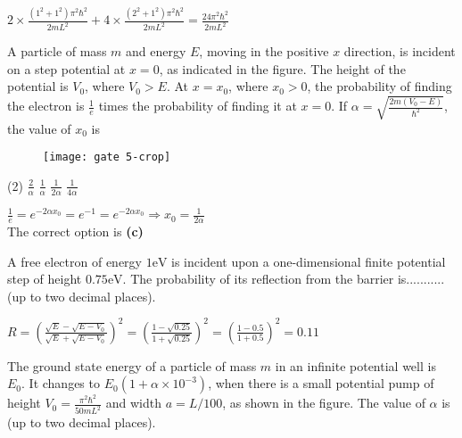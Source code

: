 \begin{enumerate}
\begin{minipage}{\textwidth}
	\end{minipage}
	\begin{answer}
		$ 2 \times \frac{\left(1^{2}+1^{2}\right) \pi^{2} \hbar^{2}}{2 m L^{2}}+4 \times \frac{\left(2^{2}+1^{2}\right) \pi^{2} \hbar^{2}}{2 m L^{2}}=\frac{24 \pi^{2} \hbar^{2}}{2 m L^{2}}$	
	\end{answer}
	\begin{minipage}{\textwidth}
		\item A particle of mass $m$ and energy $E$, moving in the positive $x$ direction, is incident on a step potential at $x=0$, as indicated in the figure. The height of the potential is $V_{0}$, where $V_{0}>E$. At $x=x_{0}$, where $x_{0}>0$, the probability of finding the electron is $\frac{1}{e}$ times the probability of finding it at $x=0$. If $\alpha=\sqrt{\frac{2 m\left(V_{0}-E\right)}{\hbar^{2}}}$, the value of $x_{0}$ is
		\begin{figure}[H]
			\centering
			\texttt{[image: gate 5-crop]}
		\end{figure}
	\end{minipage}
	\begin{tasks}(2)
		\task[\textbf{A.}] $\frac{2}{\alpha}$
		\task[\textbf{B.}] $\frac{1}{\alpha}$
		\task[\textbf{C.}]$\frac{1}{2 \alpha}$
		\task[\textbf{D.}]$\frac{1}{4 \alpha}$
	\end{tasks}
	\begin{answer}
		$\frac{1}{e}=e^{-2 \alpha x_{0}}=e^{-1}=e^{-2 \alpha x_{0}} \Rightarrow x_{0}=\frac{1}{2 \alpha}$\\
		The correct option is \textbf{(c)}	
	\end{answer}
	\begin{minipage}{\textwidth}
		\item A free electron of energy $1 \mathrm{eV}$ is incident upon a one-dimensional finite potential step of height $0.75 \mathrm{eV}$. The probability of its reflection from the barrier is........... (up to two decimal places).
	\end{minipage}
	\begin{answer}
		$R=\left(\frac{\sqrt{E}-\sqrt{E-V_{0}}}{\sqrt{E}+\sqrt{E-V_{0}}}\right)^{2}=\left(\frac{1-\sqrt{0.25}}{1+\sqrt{0.25}}\right)^{2}=\left(\frac{1-0.5}{1+0.5}\right)^{2}=0.11$
	\end{answer}
	\begin{minipage}{\textwidth}
		\item The ground state energy of a particle of mass $m$ in an infinite potential well is $E_{0} .$ It changes to $E_{0}\left(1+\alpha \times 10^{-3}\right)$, when there is a small potential pump of height $V_{0}=\frac{\pi^{2} \hbar^{2}}{50 m L^{2}}$ and width $a=L / 100$, as shown in the figure. The value of $\alpha$ is (up to two decimal places).

\end{minipage}
\end{enumerate}
